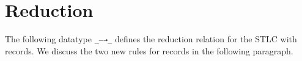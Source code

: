 \hypertarget{reduction}{%
\section{Reduction}\label{reduction}}

The following datatype \texttt{\_—→\_} defines the reduction relation
for the STLC with records. We discuss the two new rules for records in
the following paragraph.

\begin{fence}
\begin{code}%
\>[0]\AgdaSpace{}%
\AgdaSpace{}%
\AgdaSymbol{:}\AgdaSpace{}%
\AgdaSpace{}%
\AgdaSpace{}%
\AgdaSpace{}%
\AgdaSpace{}%
\AgdaSpace{}%
\<%
\\
%
\\[\AgdaEmptyExtraSkip]%
\>[0][@{}l@{\AgdaIndent{0}}]%
\>[2]\AgdaSpace{}%
\AgdaSymbol{:}\AgdaSpace{}%
\AgdaSpace{}%
\AgdaSymbol{\{}\AgdaSpace{}%
\AgdaSpace{}%
\AgdaSpace{}%
\AgdaSymbol{:}\AgdaSpace{}%
\AgdaSymbol{\}}\<%
\\
\>[2][@{}l@{\AgdaIndent{0}}]%
\>[4]%
\>[1829I]\AgdaSpace{}%
\AgdaSpace{}%
\<%
\\
\>[.][@{}l@{}]\<[1829I]%
\>[6]\AgdaComment{---------------}\<%
\\
%
\>[4]\AgdaSpace{}%
\AgdaSpace{}%
\AgdaSpace{}%
\AgdaSpace{}%
\AgdaSpace{}%
\AgdaSpace{}%
\AgdaSpace{}%
\<%
\\
%
\\[\AgdaEmptyExtraSkip]%
%
\>[2]\AgdaSpace{}%
\AgdaSymbol{:}\AgdaSpace{}%
\AgdaSpace{}%
\AgdaSymbol{\{}%
\>[15]\AgdaSpace{}%
\AgdaSpace{}%
\AgdaSymbol{:}\AgdaSpace{}%
\AgdaSymbol{\}}\<%
\\
\>[2][@{}l@{\AgdaIndent{0}}]%
\>[4]\AgdaSpace{}%
\AgdaSpace{}%
\<%
\\
%
\>[4]%
\>[1847I]\AgdaSpace{}%
\AgdaSpace{}%

\end{code}
\end{fence}
